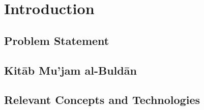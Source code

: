 \chapter{Introduction}\label{ch:introduction}

\section{Problem Statement}\label{sec:problem-statement}


\section{Kitāb Mu'jam al-Buldān}\label{sec:yagut}


\section{Relevant Concepts and Technologies}\label{sec:relevant-concepts}


